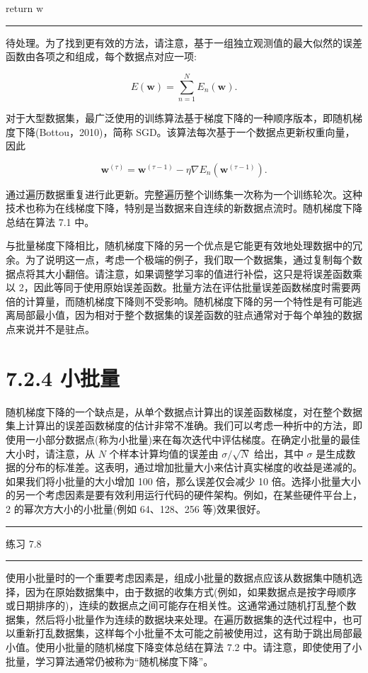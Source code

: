 \documentclass[10pt]{report}
\newcommand{\HRule}{\begin{center}\rule{0.9\linewidth}{0.2mm}\end{center}}
\begin{document}
return \(\mathrm{w}\)

\HRule

待处理。为了找到更有效的方法，请注意，基于一组独立观测值的最大似然的误差函数由各项之和组成，每个数据点对应一项:

\[
E\left( \mathbf{w}\right)  = \mathop{\sum }\limits_{{n = 1}}^{N}{E}_{n}\left( \mathbf{w}\right) . \tag{7.17}
\]

对于大型数据集，最广泛使用的训练算法基于梯度下降的一种顺序版本，即随机梯度下降(Bottou，2010)，简称 SGD。该算法每次基于一个数据点更新权重向量，因此

\[
{\mathbf{w}}^{\left( \tau \right) } = {\mathbf{w}}^{\left( \tau  - 1\right) } - \eta \nabla {E}_{n}\left( {\mathbf{w}}^{\left( \tau  - 1\right) }\right) . \tag{7.18}
\]

通过遍历数据重复进行此更新。完整遍历整个训练集一次称为一个训练轮次。这种技术也称为在线梯度下降，特别是当数据来自连续的新数据点流时。随机梯度下降总结在算法 7.1 中。

与批量梯度下降相比，随机梯度下降的另一个优点是它能更有效地处理数据中的冗余。为了说明这一点，考虑一个极端的例子，我们取一个数据集，通过复制每个数据点将其大小翻倍。请注意，如果调整学习率的值进行补偿，这只是将误差函数乘以 2，因此等同于使用原始误差函数。批量方法在评估批量误差函数梯度时需要两倍的计算量，而随机梯度下降则不受影响。随机梯度下降的另一个特性是有可能逃离局部最小值，因为相对于整个数据集的误差函数的驻点通常对于每个单独的数据点来说并不是驻点。

\section*{7.2.4 小批量}

随机梯度下降的一个缺点是，从单个数据点计算出的误差函数梯度，对在整个数据集上计算出的误差函数梯度的估计非常不准确。我们可以考虑一种折中的方法，即使用一小部分数据点(称为小批量)来在每次迭代中评估梯度。在确定小批量的最佳大小时，请注意，从 \(N\) 个样本计算均值的误差由 \(\sigma /\sqrt{N}\) 给出，其中 \(\sigma\) 是生成数据的分布的标准差。这表明，通过增加批量大小来估计真实梯度的收益是递减的。如果我们将小批量的大小增加 100 倍，那么误差仅会减少 10 倍。选择小批量大小的另一个考虑因素是要有效利用运行代码的硬件架构。例如，在某些硬件平台上，2 的幂次方大小的小批量(例如 64、128、256 等)效果很好。

\HRule

练习 7.8

\HRule

使用小批量时的一个重要考虑因素是，组成小批量的数据点应该从数据集中随机选择，因为在原始数据集中，由于数据的收集方式(例如，如果数据点是按字母顺序或日期排序的)，连续的数据点之间可能存在相关性。这通常通过随机打乱整个数据集，然后将小批量作为连续的数据块来处理。在遍历数据集的迭代过程中，也可以重新打乱数据集，这样每个小批量不太可能之前被使用过，这有助于跳出局部最小值。使用小批量的随机梯度下降变体总结在算法 7.2 中。请注意，即使使用了小批量，学习算法通常仍被称为“随机梯度下降”。
\end{document}
